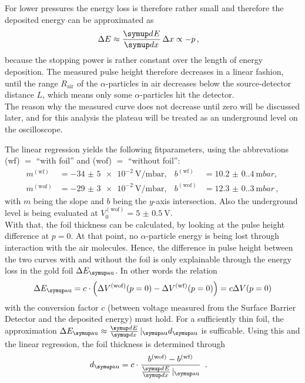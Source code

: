 For lower pressures the energy loss is therefore rather small and therefore the deposited energy can be approximated as 
\begin{align}
    \Delta E &\approx \dif{E}{x} \Delta x \propto -p \, ,
\end{align}
because the stopping power is rather constant over the length of energy deposition.
The measured pulse height therefore decreases in a linear fashion, until the range $R_\text{air}$ of the $\alpha$-particles in air decreases below the source-detector distance $L$, which means only some $\alpha$-particles hit the detector. \\
The reason why the measured curve does not decrease until zero will be discussed later, and for this analysis the plateau will be treated as an underground level on the oscilloscope.

The linear regression yields the following fitparameters, using the abbrevations (wf) $=$ ``with foil'' and (wof) $=$ ``without foil'':
\begin{align}
    m^{\mathrm{(wf)}} &= \qty{-34(5)e-2}{\volt\per\milli\bar}, & b^{\mathrm{(wf)}} &= \qty{10.2(0.4)}{\milli bar}, \\
    m^{\mathrm{(wof)}} &= \qty{-29(3)e-2}{\volt\per\milli\bar}, & b^{\mathrm{(wof)}} &= \qty{12.3(0.3)}{\milli bar} \, ,
\end{align}
with $m$ being the slope and $b$ being the $y$-axis intersection. 
Also the underground level is being evaluated at $V_0^{\mathrm{(wof)}} = \qty{5(0.5)}{\volt}$. \\

With that, the foil thickness can be calculated, by looking at the pulse height difference at $p = 0$. 
At that point, no $\alpha$-particle energy is being lost through interaction with the air molecules.
Hence, the difference in pulse height between the two curves with and without the foil is only explainable through the energy loss in the gold foil $\Delta E_\T{au}$. 
In other words the relation 
\begin{align}
    \Delta E_\T{au} = c \cdot \left(\Delta {V}^{\mathrm{(wof)}}(p=0) - \Delta V^{\mathrm{(wf)}}(p=0)\right) = c \Delta V(p=0)
\end{align}
with the conversion factor $c$ (between voltage measured from the Surface Barrier Detector and the deposited energy) must hold. 
For a sufficiently thin foil, the approximation $\Delta E_\T{au} \approx \dif{E}{x}|_\T{au} d_\T{au}$ is sufficable.
Using this and the linear regression, the foil thickness is determined through
\begin{align}
    d_\T{au} &= c \cdot \frac{b^{\mathrm{(wof)}} - b^{\mathrm{(wf)}}}{\dif{E}{x}|_\T{au}}~\label{eq:delta_x} \, .
\end{align}

